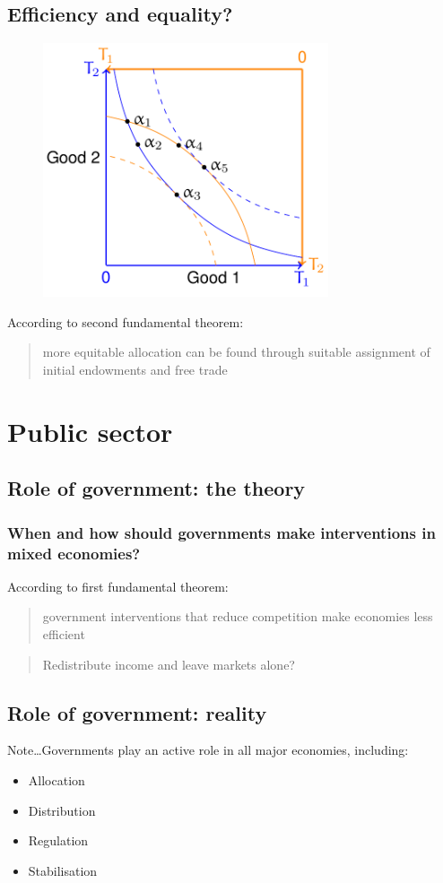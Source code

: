 \subsection{Efficiency and equality?}
\begin{figure}[H]
  \centering
  \includegraphics[width =0.5 \textwidth]{./img/figure12.png}
  \caption{}
\end{figure}
According to second fundamental theorem:
\begin{quote}
  more equitable allocation can be found through suitable assignment of initial endowments and free trade
\end{quote}
\section{Public sector}
\subsection{Role of government: the theory}
\subsubsection{When and how should governments make interventions in mixed economies?}
According to first fundamental theorem:
\begin{quote}
  government interventions that reduce competition make economies less efficient
\end{quote}
\begin{quote}
  Redistribute income and leave markets alone?
\end{quote}
\subsection{Role of government: reality}
Note\dots Governments play an active role in all major economies, including:
\begin{itemize}
  \item Allocation
  \item Distribution
  \item Regulation
  \item Stabilisation
\end{itemize}
